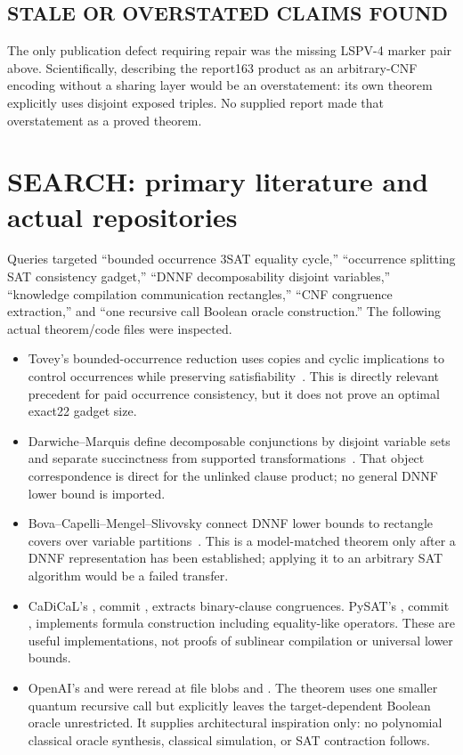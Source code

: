 \documentclass[11pt]{article}
\begin{document}
\subsection*{STALE OR OVERSTATED CLAIMS FOUND}
The only publication defect requiring repair was the missing LSPV-4 marker
pair above.  Scientifically, describing the report163 product as an
arbitrary-CNF encoding without a sharing layer would be an overstatement: its
own theorem explicitly uses disjoint exposed triples.  No supplied report
made that overstatement as a proved theorem.

\section{SEARCH: primary literature and actual repositories}
Queries targeted ``bounded occurrence 3SAT equality cycle,'' ``occurrence
splitting SAT consistency gadget,'' ``DNNF decomposability disjoint variables,''
``knowledge compilation communication rectangles,'' ``CNF congruence
extraction,'' and ``one recursive call Boolean oracle construction.''  The
following actual theorem/code files were inspected.
\begin{itemize}
\item Tovey's bounded-occurrence reduction uses copies and cyclic implications
to control occurrences while preserving satisfiability~\cite{tovey}.  This is
directly relevant precedent for paid occurrence consistency, but it does not
prove an optimal exact22 gadget size.
\item Darwiche--Marquis define decomposable conjunctions by disjoint variable
sets and separate succinctness from supported transformations~\cite{darwiche}.
That object correspondence is direct for the unlinked clause product; no
general DNNF lower bound is imported.
\item Bova--Capelli--Mengel--Slivovsky connect DNNF lower bounds to rectangle
covers over variable partitions~\cite{bova}.  This is a model-matched theorem
only after a DNNF representation has been established; applying it to an
arbitrary SAT algorithm would be a failed transfer.
\item CaDiCaL's , commit
\texttt{}, extracts binary-clause congruences.  PySAT's
, commit \texttt{}, implements
formula construction including equality-like operators.  These are useful
implementations, not proofs of sublinear compilation or universal lower
bounds.
\item OpenAI's
and  were reread at file blobs
\texttt{} and
\texttt{}.  The theorem
uses one smaller quantum recursive call but explicitly leaves the
target-dependent Boolean oracle unrestricted.  It supplies architectural
inspiration only: no polynomial classical oracle synthesis, classical
simulation, or SAT contraction follows.
\end{itemize}
\end{document}
